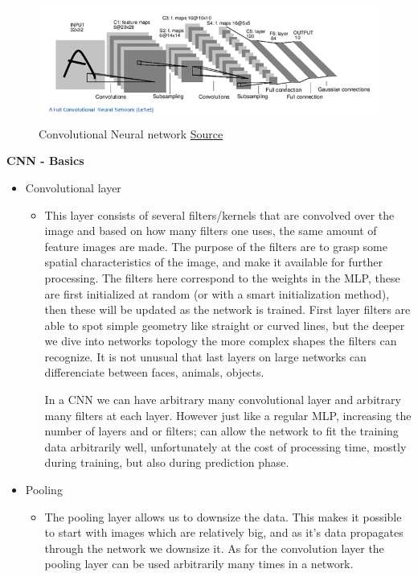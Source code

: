 \documentclass[Report.tex]{subfiles}
\begin{document}
\begin{figure}[H]
  \centering
  \includegraphics[height=4cm]{res/LeNet.png}
  \caption{Convolutional Neural network \href{https://adeshpande3.github.io/A-Beginner\%27s-Guide-To-Understanding-Convolutional-Neural-Networks/}{Source}}
  \label{fig:CNN_architecture}
\end{figure}

\begin{flushleft}
  \textbf{CNN - Basics} \\
  \begin{itemize}
   \item{Convolutional layer}
   \begin{itemize}
    \item{This layer consists of several filters/kernels that are convolved over the image and based on how many filters one uses, the same amount of feature images are made. The purpose of the filters are to grasp some spatial characteristics of the image, and make it available for further processing.
    The filters here correspond to the weights in the MLP, these are first initialized at random (or with a smart initialization method), then these will be updated as the network is trained. 
First layer filters are able to spot simple geometry like straight or curved lines, but the deeper we dive into networks topology the more complex shapes the filters can recognize. It is not unusual that last layers on large networks can differenciate between faces, animals, objects.\par
    In a CNN we can have arbitrary many convolutional layer and arbitrary many filters at each layer. However just like a regular MLP, increasing the number of layers and or filters; can allow the network to fit the training data arbitrarily well, unfortunately at the cost of processing time, mostly during training, but also during prediction phase.}
   \end{itemize}
   \item{Pooling}
   \begin{itemize}
    \item{The pooling layer allows us to downsize the data. This makes it possible to start with images which are relatively big, and as it's data propagates through the network we downsize it. As for the convolution layer the pooling layer can be used arbitrarily many times in a network.
}
\end{itemize}
\end{itemize}
\end{flushleft}
\end{document}
